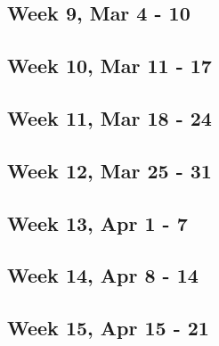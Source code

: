 \documentclass{article}
\begin{document}
\subsection{Week 9, Mar 4 - 10}

\subsection{Week 10, Mar 11 - 17}

\subsection{Week 11, Mar 18 - 24}

\subsection{Week 12, Mar 25 - 31}

\subsection{Week 13, Apr 1 - 7}

\subsection{Week 14, Apr 8 - 14}

\subsection{Week 15, Apr 15 - 21}
\end{document}
